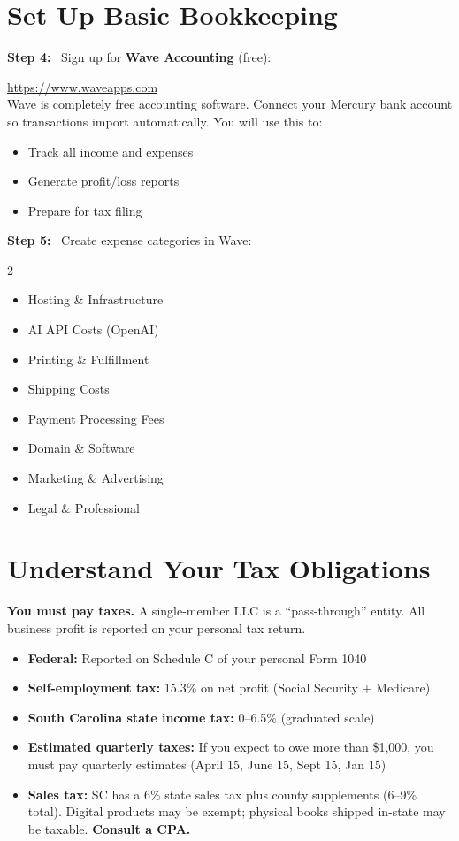 \documentclass[12pt, letterpaper, oneside]{book}
\newcommand{\step}[1]{\noindent\textbf{\textcolor{primary}{Step #1:}}~}
\begin{document}
\section{Set Up Basic Bookkeeping}

\step{4} Sign up for \textbf{Wave Accounting} (free):
\begin{actionbox}
\url{https://www.waveapps.com}\\[4pt]
Wave is completely free accounting software. Connect your Mercury bank account so transactions import automatically. You will use this to:
\begin{itemize}[leftmargin=1.5em]
  \item Track all income and expenses
  \item Generate profit/loss reports
  \item Prepare for tax filing
\end{itemize}
\end{actionbox}

\step{5} Create expense categories in Wave:
\begin{multicols}{2}
\begin{itemize}[leftmargin=1.5em, itemsep=1pt]
  \item Hosting \& Infrastructure
  \item AI API Costs (OpenAI)
  \item Printing \& Fulfillment
  \item Shipping Costs
  \item Payment Processing Fees
  \item Domain \& Software
  \item Marketing \& Advertising
  \item Legal \& Professional
\end{itemize}
\end{multicols}

\section{Understand Your Tax Obligations}

\begin{warningbox}
\textbf{You must pay taxes.} A single-member LLC is a ``pass-through'' entity. All business profit is reported on your personal tax return.
\begin{itemize}[leftmargin=1.5em]
  \item \textbf{Federal:} Reported on Schedule C of your personal Form 1040
  \item \textbf{Self-employment tax:} 15.3\% on net profit (Social Security + Medicare)
  \item \textbf{South Carolina state income tax:} 0--6.5\% (graduated scale)
  \item \textbf{Estimated quarterly taxes:} If you expect to owe more than \$1{,}000, you must pay quarterly estimates (April 15, June 15, Sept 15, Jan 15)
  \item \textbf{Sales tax:} SC has a 6\% state sales tax plus county supplements (6--9\% total). Digital products may be exempt; physical books shipped in-state may be taxable. \textbf{Consult a CPA.}
\end{itemize}
\end{warningbox}
\end{document}
